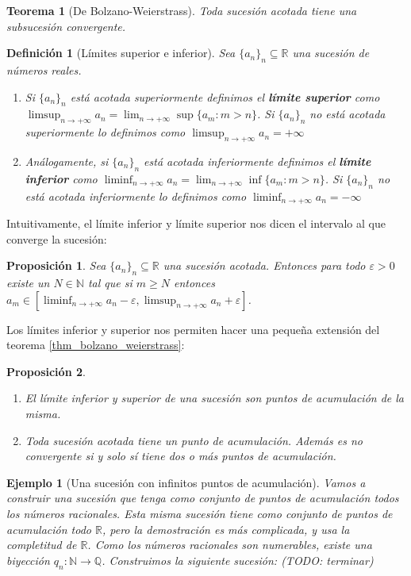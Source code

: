 \documentclass{article}
\newtheorem{theorem}{Teorema}
\newtheorem{prop}{Proposición}
\newtheorem{define}{Definición}
\newtheorem{ejem}{Ejemplo}
\newcommand{\reales}{\mathbb{R}}
\newcommand{\naturales}{\mathbb{N}}
\newcommand{\racionales}{\mathbb{Q}}
\newcommand{\sucesion}[1]{\{ #1 _n \}_n}
\newcommand{\sucreal}[1]{\{ #1 _n \}_n \subseteq \reales}
\newcommand{\limitesup}[1]{\limsup_{n\rightarrow +\infty} #1 _n}
\newcommand{\limiteinf}[1]{\liminf_{n\rightarrow +\infty} #1 _n}
\begin{document}
\begin{theorem}[De Bolzano-Weierstrass]
\label{thm_bolzano_weierstrass}
	Toda sucesión acotada tiene una subsucesión convergente.
\end{theorem}

\begin{define}[Límites superior e inferior]
	Sea $\sucreal{a}$ una sucesión de números reales. 
	\begin{enumerate}
	\item
	Si $\sucesion{a}$ está acotada superiormente definimos el \textbf{límite superior} como $\limitesup{a} = \lim_{n \rightarrow +\infty} \sup\{ a_m : m > n\}$. Si $\sucesion{a}$ no está acotada superiormente lo definimos como $\limsup_{n\rightarrow +\infty} a_n = +\infty$
	\item
	Análogamente, si $\sucesion{a}$ está acotada inferiormente definimos el \textbf{límite inferior} como $\limiteinf{a} = \lim_{n \rightarrow +\infty} \inf\{ a_m : m > n\}$. Si $\sucesion{a}$ no está acotada inferiormente lo definimos como $\liminf_{n\rightarrow +\infty} a_n = -\infty$
	\end{enumerate}
\end{define}

Intuitivamente, el límite inferior y límite superior nos dicen el intervalo al que converge la sucesión:

\begin{prop}
	Sea $\sucreal{a}$ una sucesión acotada. Entonces para todo $\varepsilon > 0$ existe un $N \in \naturales$ tal que si $m \geq N$ entonces $a_m \in [\limiteinf{a}-\varepsilon, \limitesup{a}+\varepsilon]$.
\end{prop}

Los límites inferior y superior nos permiten hacer una pequeña extensión del teorema \eqref{thm_bolzano_weierstrass}:
\begin{prop}
\begin{enumerate}
\item
	El límite inferior y superior de una sucesión son puntos de acumulación de la misma.
\item
	Toda sucesión acotada tiene un punto de acumulación. Además es no convergente si y solo sí tiene dos o más puntos de acumulación.
\end{enumerate}
\end{prop}

\begin{ejem}[Una sucesión con infinitos puntos de acumulación]
	Vamos a construir una sucesión que tenga como conjunto de puntos de acumulación todos los números racionales. Esta misma sucesión tiene como conjunto de puntos de acumulación todo $\reales$, pero la demostración es más complicada, y usa la completitud de $\reales$.
	Como los números racionales son numerables, existe una biyección $q_n : \naturales \rightarrow \racionales$. Construimos la siguiente sucesión: (TODO: terminar)
\end{ejem}
\end{document}
